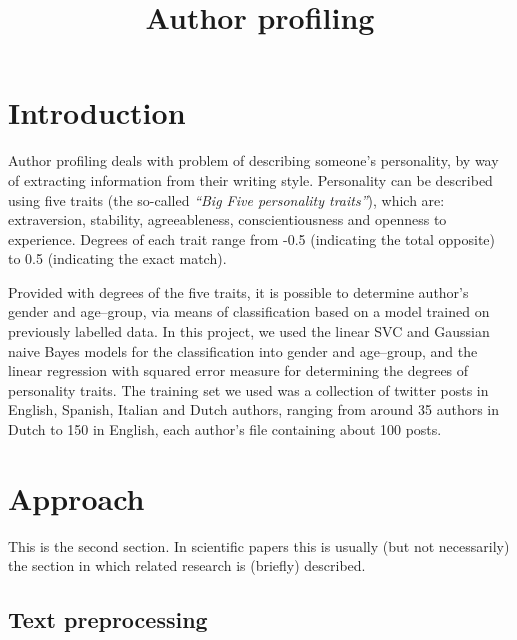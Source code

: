 \documentclass[10pt, a4paper]{article}
\title{Author profiling}
\begin{document}
\maketitleabstract

\section{Introduction}

Author profiling deals with problem of describing someone's personality, by way of extracting information from their writing style.
Personality can be described using five traits (the so-called \textit{``Big Five personality traits''}), which are: extraversion, stability, agreeableness, conscientiousness and openness to experience.
Degrees of each trait range from -0.5 (indicating the total opposite) to 0.5 (indicating the exact match).

Provided with degrees of the five traits, it is possible to determine author's gender and age--group, via means of classification based on a model trained on previously labelled data.
In this project, we used the linear SVC and Gaussian naive Bayes models for the classification into gender and age--group, and the linear regression with squared error measure for determining the degrees of personality traits.
The training set we used was a collection of twitter posts in English, Spanish, Italian and Dutch authors, ranging from around 35 authors in Dutch to 150 in English, each author's file containing about 100 posts.

\section{Approach}

This is the second section. In scientific papers this is usually (but not necessarily) the section in which related research is (briefly) described. 

\subsection{Text preprocessing}
\end{document}
